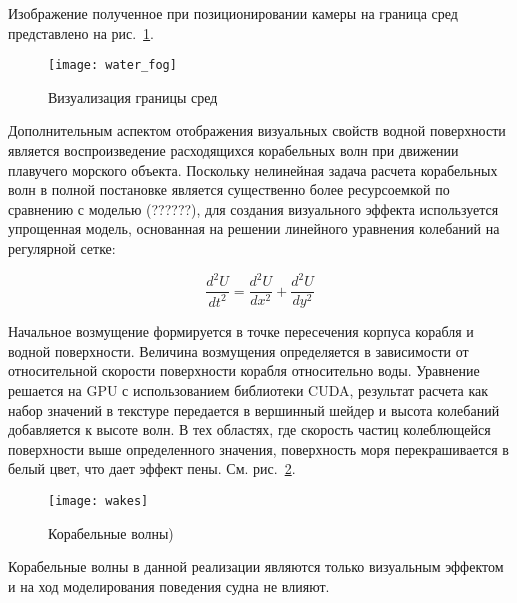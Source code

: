 Изображение полученное при позиционировании камеры на граница сред представлено на рис.~\ref{water_fog}.

\begin{figure}[ht]
\begin{center}
\texttt{[image: water\_fog]}
\end{center}
\caption{Визуализация границы сред}
\label{water_fog}
\end{figure}



Дополнительным аспектом отображения визуальных свойств водной поверхности является воспроизведение расходящихся корабельных волн при движении плавучего морского объекта. Поскольку нелинейная задача расчета корабельных волн в полной постановке является существенно более ресурсоемкой по сравнению с моделью (??????), для создания визуального эффекта используется упрощенная модель, основанная на решении линейного уравнения колебаний на регулярной сетке:

\begin{equation}
	\frac{d^2U}{dt^2} = \frac{d^2U}{dx^2} +  \frac{d^2U}{dy^2}
\end{equation}

Начальное возмущение формируется в точке пересечения корпуса корабля и водной поверхности. Величина возмущения определяется в зависимости от относительной скорости поверхности корабля относительно воды. Уравнение решается на GPU с использованием библиотеки CUDA, результат расчета как набор значений в текстуре передается в вершинный шейдер и высота колебаний добавляется к высоте волн. В тех областях, где скорость частиц колеблющейся поверхности выше определенного значения, поверхность моря перекрашивается в белый цвет, что дает эффект пены. См. рис.~\ref{wakes}.

\begin{figure}[ht]
\begin{center}
\texttt{[image: wakes]}
\end{center}
\caption{Корабельные волны)}
\label{wakes}
\end{figure}

Корабельные волны в данной реализации являются только визуальным эффектом и на ход моделирования поведения судна не влияют.




